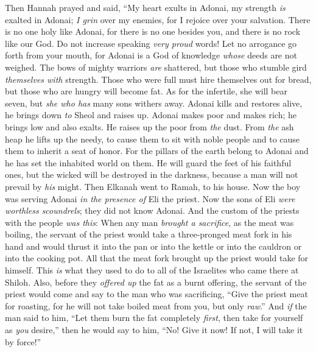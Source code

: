 \begin{biblechapter} %
\verse Then Hannah prayed and said,
\verse “My heart exults in Adonai, my strength \textit{is} exalted in Adonai; \textit{I grin} over my enemies, for I rejoice over your salvation.
\verse There is no one holy like Adonai, for there is no one besides you, 
and there is no rock like our God.
\verse Do not increase speaking \textit{very proud} words! 
Let no arrogance go forth from your mouth, 
for Adonai is a God of knowledge 
\textit{whose} deeds are not weighed.
\verse The bows of mighty warriors \textit{are} shattered, 
but those who stumble gird \textit{themselves with} strength.
\verse Those who were full must hire themselves out for bread, 
but those who are hungry will become fat. 
As for the infertile, she will bear seven, 
but \textit{she who has} many sons withers away.
\verse Adonai kills and restores alive, 
he brings down \textit{to} Sheol and raises up.
\verse Adonai makes poor and makes rich; 
he brings low and also exalts.
\verse He raises up the poor from \textit{the} dust. 
From \textit{the} ash heap he lifts up the needy, 
to cause them to sit with noble people 
and to cause them to inherit a seat of honor. 
For the pillars of the earth belong to Adonai 
and he has set the inhabited world on them.
\verse He will guard the feet of his faithful ones, 
but the wicked will be destroyed in the darkness, 
because a man will not prevail by \textit{his} might.
\verse Then Elkanah went to Ramah, to his house. Now the boy was serving Adonai \textit{in the presence of} Eli the priest.
 Now the sons of Eli \textit{were} \textit{worthless scoundrels}; they did not know Adonai.
\verse And the custom of the priests with the people \textit{was this}: When any man \textit{brought a sacrifice}, as the meat was boiling, the servant of the priest would take a three-pronged meat fork in his hand
\verse and would thrust it into the pan or into the kettle or into the cauldron or into the cooking pot. All that the meat fork brought up the priest would take for himself. This \textit{is} what they used to do to all of the Israelites who came there at Shiloh.
\verse Also, before they \textit{offered up} the fat as a burnt offering, the servant of the priest would come and say to the man who was sacrificing, “Give the priest meat for roasting, for he will not take boiled meat from you, but only \textit{raw}.”
\verse And \textit{if} the man said to him, “Let them burn the fat completely \textit{first}, then take for yourself as \textit{you} desire,” then he would say to him, “No! Give it now! If not, I will take it by force!”

\end{biblechapter}
